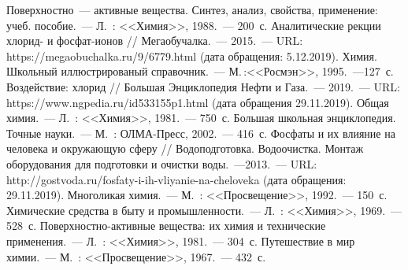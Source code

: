 \begin{thebibliography}{99}
\bibitem{} Поверхностно~--- активные вещества. Синтез, анализ, свойства, применение: учеб. пособие.~--- Л.~: <<Химия>>, 1988.~--- 200~с.
\bibitem{}Аналитические рекции хлорид- и фосфат-ионов // Мегаобучалка.~--- 2015.~--- URL: https://megaobuchalka.ru/9/6779.html (дата обращения: 5.12.2019).
\bibitem{} Химия. Школьный иллюстрированый справочник.~--- М.\,:<<Росмэн>>, 1995.~---127~с.
\bibitem{}Воздействие: хлорид // Большая Энциклопедия Нефти и Газа.~--- 2019.~--- URL: https://www.ngpedia.ru/id533155p1.html (дата обращения 29.11.2019).
\bibitem{} Общая химия.~--- Л.~: <<Химия>>, 1981.~--- 750~с.
\bibitem{} Большая школьная энциклопедия. Точные науки.~--- М.~: ОЛМА-Пресс, 2002.~--- 416~с.
\bibitem{}Фосфаты и их влияние на человека и окружающую сферу // Водоподготовка. Водоочистка. Монтаж оборудования для подготовки и очистки воды.~---2013.~--- URL: http://gostvoda.ru/fosfaty-i-ih-vliyanie-na-cheloveka (дата обращения: 29.11.2019).
\bibitem{} Многоликая химия.~--- М.~: <<Просвещение>>, 1992.~--- 150~с.
\bibitem{} Химические средства в быту и промышленности.~--- Л.~: <<Химия>>, 1969.~--- 528~с.
\bibitem{} Поверхностно-активные вещества: их химия и технические применения.~--- Л.~: <<Химия>>, 1981.~--- 304~с.
\bibitem{} Путешествие в мир химии.~--- М.~: <<Просвещение>>, 1967.~--- 432~с.
\end{thebibliography}

